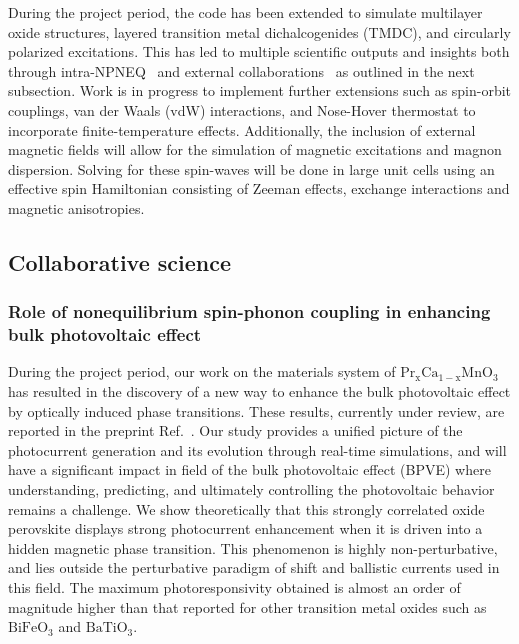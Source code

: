 During the project period, the code has been extended to simulate multilayer oxide structures, layered transition metal dichalcogenides (TMDC), and circularly polarized excitations. 
This has led to multiple scientific outputs and insights both through intra-NPNEQ~\cite{Rajpurohit2021} and external collaborations~\cite{Siddiqui2020} as outlined in the next subsection. 
Work is in progress to implement further extensions such as spin-orbit couplings, van der Waals (vdW) interactions, and Nose-Hover thermostat to incorporate finite-temperature effects. 
Additionally, the inclusion of external magnetic fields will allow for the simulation of magnetic excitations and magnon dispersion. 
Solving for these spin-waves will be done in large unit cells using an effective spin Hamiltonian consisting of Zeeman effects, exchange interactions and magnetic
anisotropies. 

\subsection{Collaborative science}\label{sec:collaborative}

\subsubsection{Role of nonequilibrium spin-phonon coupling in enhancing bulk photovoltaic effect}\label{sec:BPVE}

During the project period, our work on the materials system of \(\mathrm{Pr_xCa_{1-x}MnO_3}\) has resulted in the discovery of a new way to enhance the bulk photovoltaic effect by optically induced phase transitions. 
These results, currently under review, are reported in the preprint Ref.~\cite{Rajpurohit2021}. 
Our study provides a unified picture of the photocurrent generation and its evolution through real-time simulations, and will have a significant impact in field of the bulk photovoltaic effect (BPVE) where understanding, predicting, and ultimately controlling the photovoltaic behavior remains a challenge.
We show theoretically that this strongly correlated oxide perovskite displays strong photocurrent enhancement when it is driven into a hidden magnetic phase transition.
This phenomenon is highly non-perturbative, and lies outside the perturbative paradigm of shift and ballistic currents used in this field. 
The maximum photoresponsivity obtained is almost an order of magnitude higher than that reported for other transition metal oxides such as \(\mathrm{BiFeO_3}\) and \(\mathrm{BaTiO_3}\).

